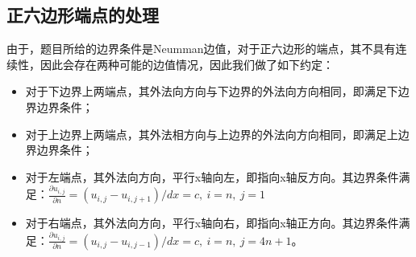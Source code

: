 \documentclass[a4paper,11pt]{ctexart} %
\begin{document}
\subsection{正六边形端点的处理}
由于，题目所给的边界条件是Neumman边值，对于正六边形的端点，其不具有连续性，因此会存在两种可能的边值情况，因此我们做了如下约定：
\begin{itemize}
\item 对于下边界上两端点，其外法向方向与下边界的外法向方向相同，即满足下边界边界条件；
\item 对于上边界上两端点，其外法相方向与上边界的外法向方向相同，即满足上边界边界条件；
\item 对于左端点，其外法向方向，平行x轴向左，即指向x轴反方向。其边界条件满足：$\frac{\partial u_{i,j}}{\partial n}=(u_{i,j}-u_{i,j+1})/dx=c,\ i=n,\ j=1$
\item 对于右端点，其外法向方向，平行x轴向右，即指向x轴正方向。其边界条件满足：$\frac{\partial u_{i,j}}{\partial n}=(u_{i,j}-u_{i,j-1})/dx=c,\ i=n,\ j=4n+1$。
\end{itemize}
\end{document}
